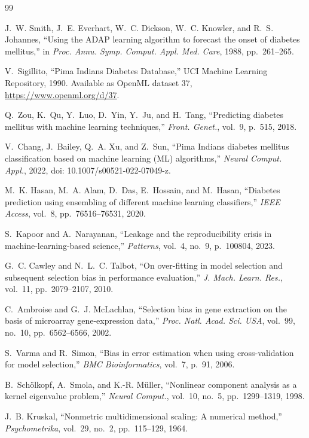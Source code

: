\documentclass[conference]{IEEEtran}
\begin{document}
\begin{thebibliography}{99}

 J.~W. Smith, J.~E. Everhart, W.~C. Dickson, W.~C. Knowler, and R.~S. Johannes, ``Using the ADAP learning algorithm to forecast the onset of diabetes mellitus,'' in \textit{Proc. Annu. Symp. Comput. Appl. Med. Care}, 1988, pp.~261--265.

 V.~Sigillito, ``Pima Indians Diabetes Database,'' UCI Machine Learning Repository, 1990. Available as OpenML dataset 37, \url{https://www.openml.org/d/37}.

 Q.~Zou, K.~Qu, Y.~Luo, D.~Yin, Y.~Ju, and H.~Tang, ``Predicting diabetes mellitus with machine learning techniques,'' \textit{Front. Genet.}, vol.~9, p.~515, 2018.

 V.~Chang, J.~Bailey, Q.~A. Xu, and Z.~Sun, ``Pima Indians diabetes mellitus classification based on machine learning (ML) algorithms,'' \textit{Neural Comput. Appl.}, 2022, doi: 10.1007/s00521-022-07049-z.

 M.~K. Hasan, M.~A. Alam, D.~Das, E.~Hossain, and M.~Hasan, ``Diabetes prediction using ensembling of different machine learning classifiers,'' \textit{IEEE Access}, vol.~8, pp.~76516--76531, 2020.

 S.~Kapoor and A.~Narayanan, ``Leakage and the reproducibility crisis in machine-learning-based science,'' \textit{Patterns}, vol.~4, no.~9, p.~100804, 2023.

 G.~C. Cawley and N.~L.~C. Talbot, ``On over-fitting in model selection and subsequent selection bias in performance evaluation,'' \textit{J. Mach. Learn. Res.}, vol.~11, pp.~2079--2107, 2010.

 C.~Ambroise and G.~J. McLachlan, ``Selection bias in gene extraction on the basis of microarray gene-expression data,'' \textit{Proc. Natl. Acad. Sci. USA}, vol.~99, no.~10, pp.~6562--6566, 2002.

 S.~Varma and R.~Simon, ``Bias in error estimation when using cross-validation for model selection,'' \textit{BMC Bioinformatics}, vol.~7, p.~91, 2006.

 B.~Sch\"{o}lkopf, A.~Smola, and K.-R. M\"{u}ller, ``Nonlinear component analysis as a kernel eigenvalue problem,'' \textit{Neural Comput.}, vol.~10, no.~5, pp.~1299--1319, 1998.

 J.~B. Kruskal, ``Nonmetric multidimensional scaling: A numerical method,'' \textit{Psychometrika}, vol.~29, no.~2, pp.~115--129, 1964.


\end{thebibliography}
\end{document}
